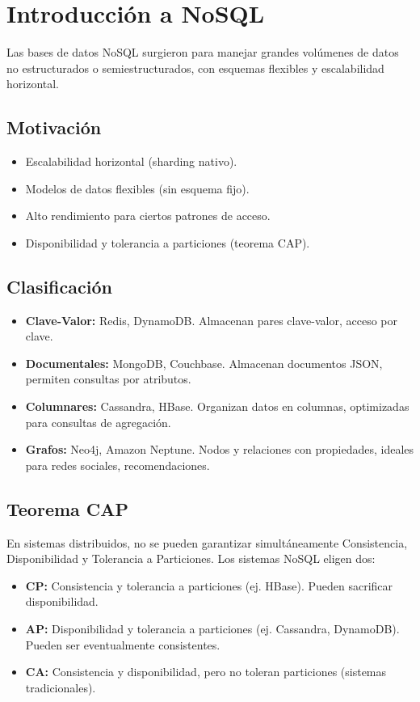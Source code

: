 \documentclass[12pt,a4paper,openany,oneside]{book}
\begin{document}
\chapter{Introducción a NoSQL}
Las bases de datos NoSQL surgieron para manejar grandes volúmenes de datos no estructurados o semiestructurados, con esquemas flexibles y escalabilidad horizontal.

\section{Motivación}
\begin{itemize}
    \item Escalabilidad horizontal (sharding nativo).
    \item Modelos de datos flexibles (sin esquema fijo).
    \item Alto rendimiento para ciertos patrones de acceso.
    \item Disponibilidad y tolerancia a particiones (teorema CAP).
\end{itemize}

\section{Clasificación}
\begin{itemize}
    \item \textbf{Clave-Valor:} Redis, DynamoDB. Almacenan pares clave-valor, acceso por clave.
    \item \textbf{Documentales:} MongoDB, Couchbase. Almacenan documentos JSON, permiten consultas por atributos.
    \item \textbf{Columnares:} Cassandra, HBase. Organizan datos en columnas, optimizadas para consultas de agregación.
    \item \textbf{Grafos:} Neo4j, Amazon Neptune. Nodos y relaciones con propiedades, ideales para redes sociales, recomendaciones.
\end{itemize}

\section{Teorema CAP}
En sistemas distribuidos, no se pueden garantizar simultáneamente Consistencia, Disponibilidad y Tolerancia a Particiones. Los sistemas NoSQL eligen dos:
\begin{itemize}
    \item \textbf{CP:} Consistencia y tolerancia a particiones (ej. HBase). Pueden sacrificar disponibilidad.
    \item \textbf{AP:} Disponibilidad y tolerancia a particiones (ej. Cassandra, DynamoDB). Pueden ser eventualmente consistentes.
    \item \textbf{CA:} Consistencia y disponibilidad, pero no toleran particiones (sistemas tradicionales).
\end{itemize}
\end{document}
